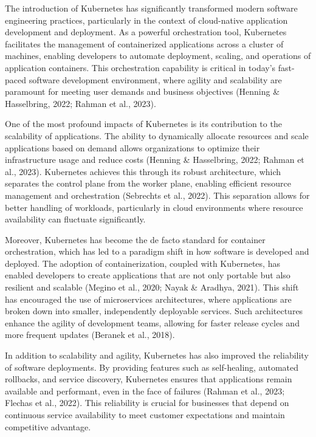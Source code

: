 The introduction of Kubernetes has significantly transformed modern software engineering practices, particularly in the context of cloud-native application development and deployment. As a powerful orchestration tool, Kubernetes facilitates the management of containerized applications across a cluster of machines, enabling developers to automate deployment, scaling, and operations of application containers. This orchestration capability is critical in today's fast-paced software development environment, where agility and scalability are paramount for meeting user demands and business objectives (Henning & Hasselbring, 2022; Rahman et al., 2023).

One of the most profound impacts of Kubernetes is its contribution to the scalability of applications. The ability to dynamically allocate resources and scale applications based on demand allows organizations to optimize their infrastructure usage and reduce costs (Henning & Hasselbring, 2022; Rahman et al., 2023). Kubernetes achieves this through its robust architecture, which separates the control plane from the worker plane, enabling efficient resource management and orchestration (Sebrechts et al., 2022). This separation allows for better handling of workloads, particularly in cloud environments where resource availability can fluctuate significantly.

Moreover, Kubernetes has become the de facto standard for container orchestration, which has led to a paradigm shift in how software is developed and deployed. The adoption of containerization, coupled with Kubernetes, has enabled developers to create applications that are not only portable but also resilient and scalable (Megino et al., 2020; Nayak & Aradhya, 2021). This shift has encouraged the use of microservices architectures, where applications are broken down into smaller, independently deployable services. Such architectures enhance the agility of development teams, allowing for faster release cycles and more frequent updates (Beranek et al., 2018).

In addition to scalability and agility, Kubernetes has also improved the reliability of software deployments. By providing features such as self-healing, automated rollbacks, and service discovery, Kubernetes ensures that applications remain available and performant, even in the face of failures (Rahman et al., 2023; Flechas et al., 2022). This reliability is crucial for businesses that depend on continuous service availability to meet customer expectations and maintain competitive advantage.


